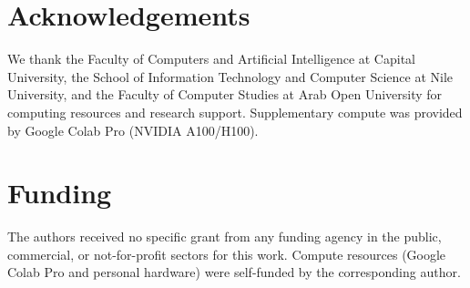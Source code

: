 \documentclass[fleqn,10pt]{article}
\begin{document}
\section*{Acknowledgements}
We thank the Faculty of Computers and Artificial Intelligence at
Capital University, the School of Information Technology and Computer
Science at Nile University, and the Faculty of Computer Studies at
Arab Open University for computing resources and research support.
Supplementary compute was provided by Google Colab Pro (NVIDIA
A100/H100).

\section*{Funding}
The authors received no specific grant from any funding agency in the
public, commercial, or not-for-profit sectors for this work. Compute
resources (Google Colab Pro and personal hardware) were self-funded
by the corresponding author.



\end{document}
